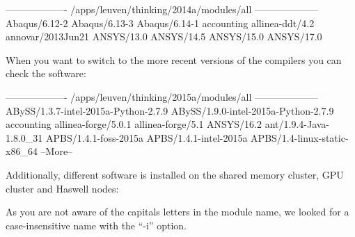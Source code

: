 \begin{prompt}
------------------- /apps/leuven/thinking/2014a/modules/all --------------------
Abaqus/6.12-2
Abaqus/6.13-3
Abaqus/6.14-1
accounting
allinea-ddt/4.2
annovar/2013Jun21
ANSYS/13.0
ANSYS/14.5
ANSYS/15.0
ANSYS/17.0
\end{prompt}

When you want to switch to the more recent versions of the compilers you can check the software:

\begin{prompt}
------------------- /apps/leuven/thinking/2015a/modules/all --------------------
ABySS/1.3.7-intel-2015a-Python-2.7.9
ABySS/1.9.0-intel-2015a-Python-2.7.9
accounting
allinea-forge/5.0.1
allinea-forge/5.1
ANSYS/16.2
ant/1.9.4-Java-1.8.0_31
APBS/1.4.1-foss-2015a
APBS/1.4.1-intel-2015a
APBS/1.4-linux-static-x86_64
--More--
\end{prompt}

Additionally, different software is installed on the shared memory cluster, GPU cluster and Haswell nodes:


As you are not aware of the capitals letters in the module name, we looked for a case-insensitive name with the ``-i'' option.
